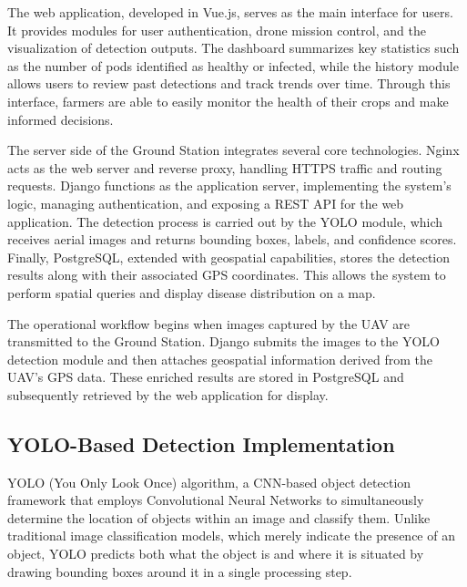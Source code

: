 The web application, developed in Vue.js, serves as the main interface for users. It provides modules for user authentication, drone mission control, and the visualization of detection outputs. The dashboard summarizes key statistics such as the number of pods identified as healthy or infected, while the history module allows users to review past detections and track trends over time. Through this interface, farmers are able to easily monitor the health of their crops and make informed decisions.

The server side of the Ground Station integrates several core technologies. Nginx acts as the web server and reverse proxy, handling HTTPS traffic and routing requests. Django functions as the application server, implementing the system’s logic, managing authentication, and exposing a REST API for the web application. The detection process is carried out by the YOLO module, which receives aerial images and returns bounding boxes, labels, and confidence scores. Finally, PostgreSQL, extended with geospatial capabilities, stores the detection results along with their associated GPS coordinates. This allows the system to perform spatial queries and display disease distribution on a map.

The operational workflow begins when images captured by the UAV are transmitted to the Ground Station. Django submits the images to the YOLO detection module and then attaches geospatial information derived from the UAV’s GPS data. These enriched results are stored in PostgreSQL and subsequently retrieved by the web application for display.

\subsection{YOLO-Based Detection Implementation}
YOLO (You Only Look Once) algorithm, a CNN-based object detection framework that employs Convolutional Neural Networks to simultaneously determine the location of objects within an image and classify them. Unlike traditional image classification models, which merely indicate the presence of an object, YOLO predicts both what the object is and where it is situated by drawing bounding boxes around it in a single processing step.


